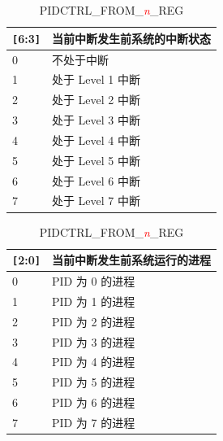 \begin{table}[H]
    \centering
    \caption{PIDCTRL\_FROM\_\textcolor{red}{\it{n}}\_REG}
    \label{table:PIDCTRL_FROM_n_REG}
    \begin{tabular}{|p{1.5cm}|p{5.5cm}|}
        \hline
        \rowcolor{lightgray}
        \verb+[+6:3\verb+]+ & 当前中断发生前系统的中断状态 \\
        \hline
        0 & 不处于中断 \\
        \hline
        1 & 处于 Level 1 中断 \\
        \hline
        2 & 处于 Level 2 中断 \\
        \hline
        3 & 处于 Level 3 中断 \\
        \hline
        4 & 处于 Level 4 中断 \\
        \hline
        5 & 处于 Level 5 中断 \\
        \hline
        6 & 处于 Level 6 中断 \\
        \hline
        7 & 处于 Level 7 中断 \\
        \hline
    \end{tabular}
    \begin{tabular}{|p{1.5cm}|p{5.5cm}|}
        \hline
        \rowcolor{lightgray}
        \verb+[+2:0\verb+]+ & 当前中断发生前系统运行的进程 \\
        \hline
        0 & PID 为 0 的进程 \\
        \hline
        1 & PID 为 1 的进程\\
        \hline
        2 & PID 为 2 的进程\\
        \hline
        3 & PID 为 3 的进程\\
        \hline
        4 & PID 为 4 的进程\\
        \hline
        5 & PID 为 5 的进程\\
        \hline
        6 & PID 为 6 的进程\\
        \hline
        7 & PID 为 7 的进程\\
        \hline
    \end{tabular}
\end{table}
